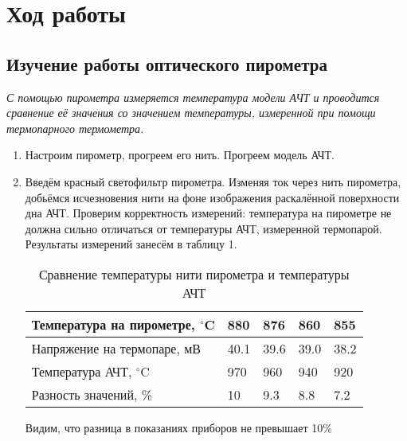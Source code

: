 \section{Ход работы}
\subsection{Изучение работы оптического пирометра}

\textit{С помощью пирометра измеряется температура модели АЧТ и проводится сравнение её значения  со значением температуры, измеренной при помощи термопарного термометра.}
\begin{enumerate}
    \item Настроим пирометр, прогреем его нить. Прогреем модель АЧТ.
    \item Введём красный светофильтр пирометра. Изменяя ток через нить пирометра, добьёмся исчезновения нити на фоне изображения раскалённой поверхности дна АЧТ. Проверим корректность измерений: температура на пирометре не должна сильно отличаться от температуры АЧТ, измеренной термопарой. Результаты измерений занесём в таблицу 1.

          \begin{table}[h]
              \centering
              \begin{center}
                  \caption{Сравнение температуры нити пирометра и температуры АЧТ}
              \end{center}
              \vspace{0.1cm}
              \label{tab:my_label}
              \begin{tabular}{ |p{4.5cm}||p{1cm}|p{1cm}|p{1cm}|p{1cm}|}
                  \hline
                  Температура на пирометре, $^{\circ}$C & 880  & 876  & 860  & 855  \\
                  \hline
                  Напряжение на термопаре, мВ           & 40.1 & 39.6 & 39.0 & 38.2 \\
                  \hline
                  Температура АЧТ, $^{\circ}$C          & 970  & 960  & 940  & 920  \\
                  \hline
                  Разность значений, \%                 & 10   & 9.3  & 8.8  & 7.2  \\
                  \hline
              \end{tabular}
          \end{table}

          Видим, что разница в показаниях приборов не превышает 10\%
\end{enumerate}


